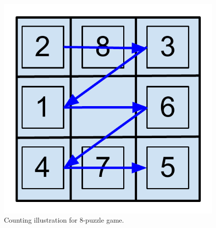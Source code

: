 \documentclass{article}
\begin{document}
\begin{figure}[h]
  \centering 
  \includegraphics[scale=.5]{AI-HWK-1_11.pdf}
  \caption{Counting illustration for 8-puzzle game. }
  \label{fig:ai-hwk1-11}
\end{figure}
\end{document}
